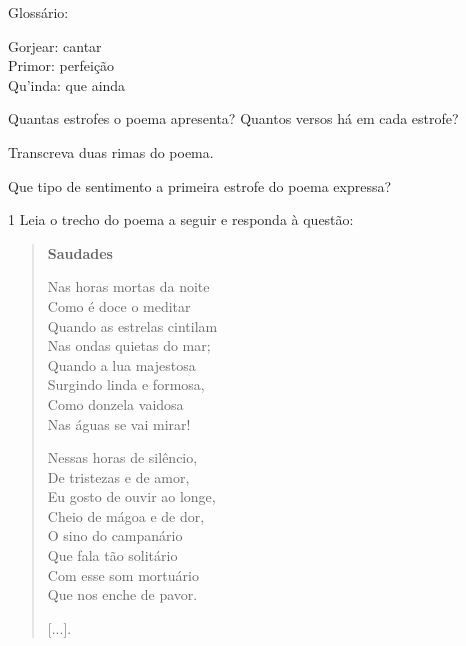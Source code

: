 Glossário:

Gorjear: cantar\\
Primor: perfeição\\
Qu'inda: que ainda

\begin{escolha}
\item Quantas estrofes o poema apresenta? Quantos versos há em cada
estrofe?



\item Transcreva duas rimas do poema.



\item Que tipo de sentimento a primeira estrofe do poema expressa?

\end{escolha}



\num{1} Leia o trecho do poema a seguir e responda à questão:

\begin{quote}
\textbf{Saudades}

Nas horas mortas da noite\\
Como é doce o meditar\\
Quando as estrelas cintilam\\
Nas ondas quietas do mar;\\
Quando a lua majestosa\\
Surgindo linda e formosa,\\
Como donzela vaidosa\\
Nas águas se vai mirar!

Nessas horas de silêncio,\\
De tristezas e de amor,\\
Eu gosto de ouvir ao longe,\\
Cheio de mágoa e de dor,\\
O sino do campanário\\
Que fala tão solitário\\
Com esse som mortuário\\
Que nos enche de pavor.

{[}...{]}.

\end{quote}

